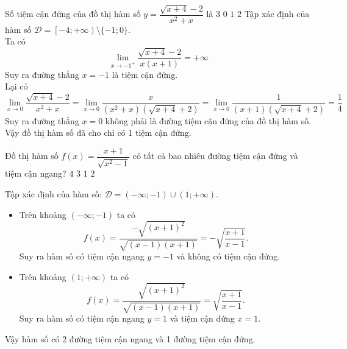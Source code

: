 \begin{ex}%
	Số tiệm cận đứng của đồ thị hàm số $ y=\dfrac{\sqrt{x+4}-2}{x^2+x} $ là 
	\choice
	{$ 3 $}
	{$ 0 $}
	{\True $ 1 $}
	{$ 2 $}
	\loigiai
	{
		Tập xác định của hàm số $ \mathscr{D} = \left[-4;+\infty\right) \setminus \{-1;0\}$.\\
		Ta có 
		\[\lim \limits_{x \to -1^{+}} \dfrac{\sqrt{x+4}-2}{x(x+1)}=+\infty\]
		Suy ra đường thẳng $ x=-1 $ là tiệm cận đứng.\\
		Lại có 
		\[\lim \limits_{x \to 0} \dfrac{\sqrt{x+4}-2}{x^2+x}=\lim \limits_{x \to 0} \dfrac{x}{\left(x^2+x\right)\left(\sqrt{x+4}+2\right)} = \lim \limits_{x \to 0} \dfrac{1}{(x+1)\left(\sqrt{x+4}+2\right)}=\dfrac{1}{4}\]
		Suy ra đường thẳng $ x=0 $ không phải là đường tiệm cận đứng của đồ thị hàm số.\\
		Vậy đồ thị hàm số đã cho chỉ có 1 tiệm cận đứng.
	}
\end{ex}
\begin{ex}%
	Đồ thị hàm số $ f(x)=\dfrac{x+1}{\sqrt{x^2-1}} $ có tất cả bao nhiêu đường tiệm cận đứng và tiệm cận ngang?
	\choice
	{$ 4 $}
	{\True $ 3 $}
	{$ 1 $}
	{$ 2 $}
	\loigiai
	{
		Tập xác định của hàm số: $ \mathscr{D} = \left(-\infty;-1\right) \cup \left(1;+\infty\right)$.\\
		\begin{itemize}
			\item Trên khoảng $ \left(-\infty;-1\right)$ ta có \[ f(x)=\dfrac{-\sqrt{(x+1)^2}}{\sqrt{(x-1)(x+1)}} = -\sqrt{\dfrac{x+1}{x-1}}.\]
			Suy ra hàm số có tiệm cận ngang $ y=-1 $ và không có tiệm cận đứng.
			\item Trên khoảng $ (1;+\infty) $ ta có 
			\[f(x)=\dfrac{\sqrt{(x+1)^2}}{\sqrt{(x-1)(x+1)}} = \sqrt{\dfrac{x+1}{x-1}}.\]
			Suy ra hàm số có tiệm cận ngang $ y=1 $ và tiệm cận đứng $ x=1 $.
		\end{itemize}
		Vậy hàm số có 2 đường tiệm cận ngang và 1 đường tiệm cận đứng.
	}
\end{ex}

